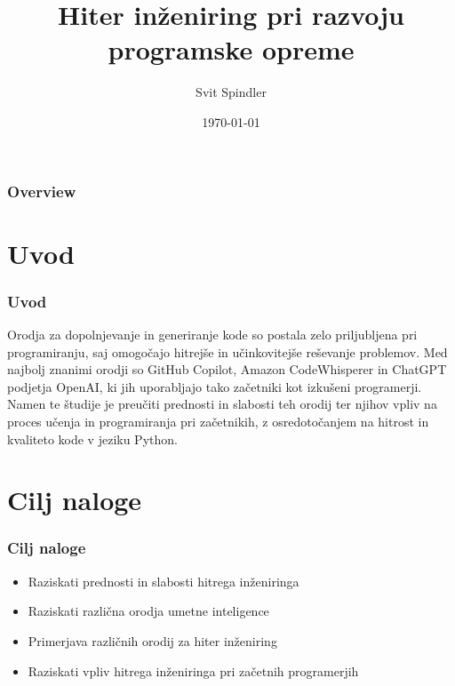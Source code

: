 \documentclass{beamer}
\title[Hiter inženiring]{Hiter inženiring pri razvoju programske opreme} %
\author{Svit Spindler} %
\institute[FRI] %
{
Univerza v Ljubljani \\ %
\medskip
\textit{svit.spindler@gmail.com} %
}
\date{\today} %
\begin{document}
\begin{frame}
\titlepage %
\end{frame}

\begin{frame}
\frametitle{Overview} %
\tableofcontents %
\end{frame}

\section{Uvod}
\begin{frame}
\frametitle{Uvod}
Orodja za dopolnjevanje in generiranje kode so postala zelo priljubljena pri programiranju, saj omogočajo hitrejše in učinkovitejše reševanje problemov. Med najbolj znanimi orodji so GitHub Copilot, Amazon CodeWhisperer in ChatGPT podjetja OpenAI, ki jih uporabljajo tako začetniki kot izkušeni programerji. Namen te študije je preučiti prednosti in slabosti teh orodij ter njihov vpliv na proces učenja in programiranja pri začetnikih, z osredotočanjem na hitrost in kvaliteto kode v jeziku Python.
\end{frame}

\section{Cilj naloge}
\begin{frame}
\frametitle{Cilj naloge}
\begin{itemize}
\item Raziskati prednosti in slabosti hitrega inženiringa
\item Raziskati različna orodja umetne inteligence
\item Primerjava različnih orodij za hiter inženiring
\item Raziskati vpliv hitrega inženiringa pri začetnih programerjih
\end{itemize}
\end{frame}
\end{document}
